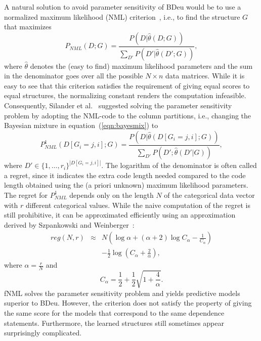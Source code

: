 A natural solution to avoid parameter sensitivity of BDeu would be to
use a normalized maximum likelihood (NML)
criterion~\cite{Shta87,Riss96a}, i.e., to find the structure $G$ that
maximizes
\begin{equation}
P_{NML}(D;G)=\frac{P(D|\hat\theta(D;G))}{\sum_{D'}{P(D'|\hat\theta(D';G))}},
\end{equation}
where $\hat\theta$ denotes the (easy to find) maximum likelihood
parameters and the sum in the denominator goes over all the possible
$N\times n$ data matrices. While it is easy to see that this criterion
satisfies the requirement of giving equal scores to equal structures,
the normalizing constant renders the computation
infeasible. Consequently, Silander et al.~\cite{cosco.pgm08a}
suggested solving the parameter sensitivity problem by adopting the
NML-code to the column partitions, i.e., changing the Bayesian mixture
in equation~(\ref{eqn:bayesmix}) to
\begin{equation}
P^1_{NML}(D[G_i=j,i];G)=\frac{P(D|\hat\theta(D[G_i=j,i];G))}{\sum_{D'}{P(D';\hat\theta(D'|G))}},
\end{equation}
where $D'\in{\{1,\ldots,r_i\}}^{|D[G_i=j,i]|}$.  The logarithm of the
denominator is often called a regret, since it indicates the extra
code length needed compared to the code length obtained using the (a
priori unknown) maximum likelihood parameters. The regret for
$P^1_{NML}$ depends only on the length $N$ of the categorical data
vector with $r$ different categorical values.  While the naive
computation of the regret is still prohibitive, it can be approximated
efficiently using an approximation derived by Szpankowski and
Weinberger~\cite{Szpankowski2012}:
\begin{eqnarray}
    reg(N, r) & \approx & N\left(\log{\alpha} + (\alpha + 2) \log{C_\alpha}
                - \frac{1}{C_\alpha}\right)\nonumber \\
    && - \frac{1}{2} \log{\left(C_\alpha + \frac{2}{\alpha}\right)},
\end{eqnarray}
where $\alpha = \frac{r}{N}$ and
\begin{equation}
    C_\alpha = \frac{1}{2} + \frac{1}{2} \sqrt{1 + \frac{4}{\alpha}}.
\end{equation}
fNML solves the parameter sensitivity problem and yields predictive
models superior to BDeu.  However, the criterion does not satisfy the
property of giving the same score for the models that correspond to
the same dependence statements. Furthermore, the learned structures
still sometimes appear surprisingly complicated.

